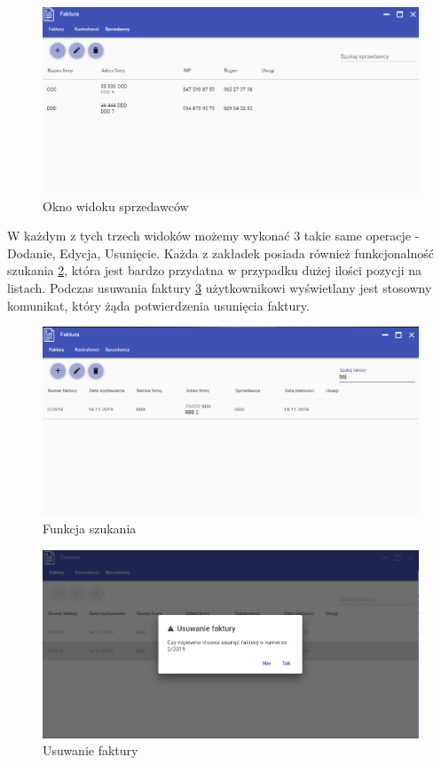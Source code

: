 \begin{figure}[ht!]
\centering
  \includegraphics[width=\linewidth]{Rysunki/Main/sellerView.png}
  \caption{Okno widoku sprzedawców}
  \label{fig:AddCustomerWindowSeller}
\end{figure}

W każdym z tych trzech widoków możemy wykonać 3 takie same operacje - Dodanie, Edycja, Usunięcie. Każda z zakładek posiada również funkcjonalność szukania \ref{fig:AddCustomerWindowSearch}, która jest bardzo przydatna w przypadku dużej ilości pozycji na listach. Podczas usuwania faktury \ref{fig:AddCustomerWindowDeleteInvoice} użytkownikowi wyświetlany jest stosowny komunikat, który żąda potwierdzenia usunięcia faktury.

\begin{figure}[ht!]
\centering
  \includegraphics[width=\linewidth]{Rysunki/Main/MainSearch.png}
  \caption{Funkcja szukania}
  \label{fig:AddCustomerWindowSearch}
\end{figure}

\begin{figure}[ht!]
\centering
  \includegraphics[width=\linewidth]{Rysunki/Main/deleteInvoiceView.png}
  \caption{Usuwanie faktury}
  \label{fig:AddCustomerWindowDeleteInvoice}
\end{figure}

